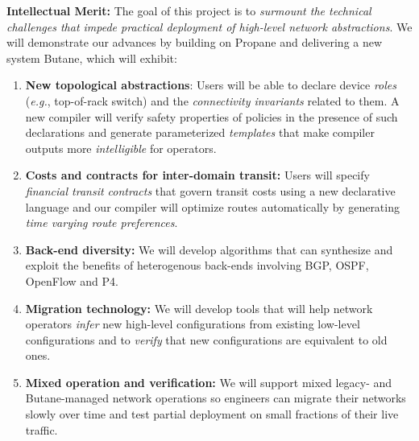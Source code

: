 \documentclass[12pt]{article}
\makeatletter
\newcommand{\Propane}{{\sc Propane}\@\xspace}
\newcommand{\Name}{{\sc Butane}\@\xspace}
\makeatother
\begin{document}
\noindent
\textbf{Intellectual Merit:} 
The goal of this project is to 
{\em surmount the technical challenges that impede practical 
deployment of high-level network abstractions}.  We will demonstrate
our advances by building on \Propane and delivering a new system \Name, which
will exhibit:  
\begin{enumerate}
\item {\bf New topological abstractions}:  Users will be able to declare device 
\emph{roles} (\emph{e.g.}, top-of-rack switch)
and the \emph{connectivity invariants} related to them.  A new compiler
will verify safety properties of policies in the presence of such 
declarations and generate parameterized \emph{templates}
that make compiler outputs more \emph{intelligible} for operators.  
\item {\bf Costs and contracts for inter-domain transit:}
Users will specify 
\emph{financial transit contracts} that govern transit
costs using a new declarative language and our compiler will
optimize routes automatically by generating  \emph{time varying route preferences}.
\item {\bf Back-end diversity:}  We will develop algorithms that
can synthesize and exploit the benefits of heterogenous back-ends 
involving BGP, OSPF, OpenFlow and P4.
\item {\bf Migration technology:} We will develop
tools that will help network operators \emph{infer} 
new high-level configurations from existing low-level configurations
and to \emph{verify} that new configurations are equivalent to old ones.
\item {\bf Mixed operation and verification:} We will support mixed
legacy- and \Name-managed network operations so engineers can
migrate their networks slowly over time and test partial deployment on
small fractions of their live traffic.
\end{enumerate}
\end{document}
